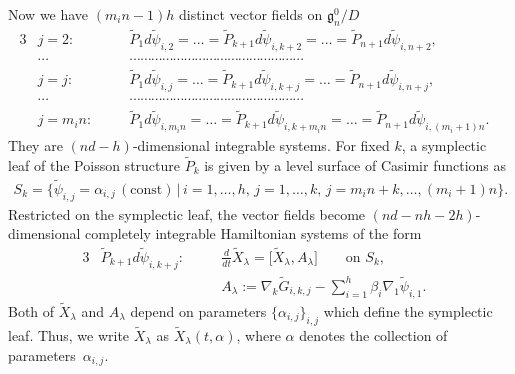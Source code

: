 \documentclass[10pt,a4paper]{amsart}
\numberwithin{equation}{section}
\begin{document}
Now we have $(m_in-1)h$ distinct vector f\/ields on $\mathfrak{g}^0_n/D$
\begin{alignat*}{3}
&j=2\colon \quad && \widetilde{P}_1 d\widetilde{\psi}_{i,2} = \dots =
 \widetilde{P}_{k+1}d\widetilde{\psi}_{i,k+2}=\dots =\widetilde{P}_{n+1}d\widetilde{\psi}_{i,n+2}, & \\
&\cdots && \cdots\cdots\cdots\cdots\cdots\cdots\cdots\cdots\cdots\cdots\cdots\cdots\cdots\cdots\cdots\cdots &\\
&j=j\colon\quad && \widetilde{P}_1 d\widetilde{\psi}_{i,j} = \dots =
 \widetilde{P}_{k+1}d\widetilde{\psi}_{i,k+j}=\dots =\widetilde{P}_{n+1}d\widetilde{\psi}_{i,n+j}, & \\
&\cdots && \cdots\cdots\cdots\cdots\cdots\cdots\cdots\cdots\cdots\cdots\cdots\cdots\cdots\cdots\cdots\cdots &\\
&j=m_in\colon \quad && \widetilde{P}_1 d\widetilde{\psi}_{i,m_in} = \dots =
 \widetilde{P}_{k+1}d\widetilde{\psi}_{i,k+m_in}=\dots =\widetilde{P}_{n+1}d\widetilde{\psi}_{i,(m_i+1)n}.
\end{alignat*}
They are $(nd-h)$-dimensional integrable systems. For f\/ixed $k$, a symplectic leaf of the Poisson structure $\widetilde{P}_k$ is given by a level surface of Casimir functions as
\begin{gather*}
S_k = \big\{ \widetilde{\psi}_{i,j} = \alpha _{i,j}\, (\text{const}) \, | \, i=1,\dots ,h,\, j=1,\dots ,k,\, j=m_in+k,\dots ,(m_i+1)n\big\}.
\end{gather*}
Restricted on the symplectic leaf, the vector f\/ields become $(nd-nh-2h)$-dimensional completely integrable Hamiltonian systems of the form
\begin{alignat}{3}
& \widetilde{P}_{k+1}d\widetilde{\psi}_{i,k+j}\colon \quad & & \frac{d}{dt}\widetilde{X}_\lambda
 = \big[\widetilde{X}_\lambda , A_\lambda \big] \qquad \text{on $S_k$},& \label{2-7} \\
& && A_\lambda :=\nabla _k\widetilde{G}_{i,k,j}-\sum^h_{i=1}\beta_i \nabla _1 \widetilde{\psi}_{i,1}. & \nonumber
\end{alignat}
Both of $\widetilde{X}_\lambda $ and $A_\lambda $ depend on parameters $\{ \alpha _{i,j}\}_{i,j}$ which def\/ine the symplectic leaf. Thus, we write $\widetilde{X}_\lambda $ as $\widetilde{X}_\lambda (t, \alpha )$, where $\alpha $ denotes the collection of parameters~$\alpha _{i,j}$.
\end{document}
